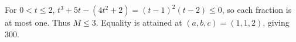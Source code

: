 For $0<t\le2$, $t^3+5t-(4t^2+2)=(t-1)^2(t-2)\le0$, so each fraction is at most one. Thus $M\le3$. Equality is attained at $(a,b,c)=(1,1,2)$, giving $\boxed{300}$.
